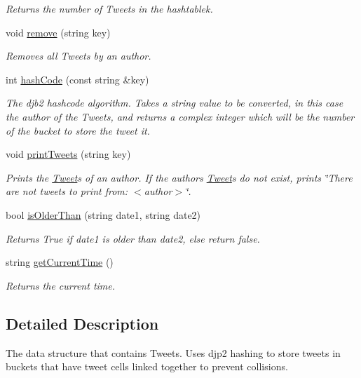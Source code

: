 \begin{DoxyCompactItemize}
\begin{DoxyCompactList}\small\item\em Returns the number of Tweets in the hashtablek. \end{DoxyCompactList}\item 
void \hyperlink{class_hashtable_aeb8fff247cc15d21d19c502294b3e780}{remove} (string key)
\begin{DoxyCompactList}\small\item\em Removes all Tweets by an author. \end{DoxyCompactList}\item 
int \hyperlink{class_hashtable_a94158aebac47b4324179a004084cb522}{hash\+Code} (const string \&key)
\begin{DoxyCompactList}\small\item\em The djb2 hashcode algorithm. Takes a string value to be converted, in this case the author of the Tweets, and returns a complex integer which will be the number of the bucket to store the tweet it. \end{DoxyCompactList}\item 
void \hyperlink{class_hashtable_ad15f012f568360b9b2e2a7903756ebf2}{print\+Tweets} (string key)
\begin{DoxyCompactList}\small\item\em Prints the \hyperlink{class_tweet}{Tweet}\textquotesingle{}s of an author. If the author\textquotesingle{}s \hyperlink{class_tweet}{Tweet}\textquotesingle{}s do not exist, prints \char`\"{}\+There are not tweets to print from\+: $<$author$>$\char`\"{}. \end{DoxyCompactList}\item 
bool \hyperlink{class_hashtable_a230cc395d2cd41dd3a71dcc35aecae75}{is\+Older\+Than} (string date1, string date2)
\begin{DoxyCompactList}\small\item\em Returns True if date1 is older than date2, else return false. \end{DoxyCompactList}\item 
string \hyperlink{class_hashtable_af44d17201ae49e4528153085dcb8766b}{get\+Current\+Time} ()
\begin{DoxyCompactList}\small\item\em Returns the current time. \end{DoxyCompactList}\end{DoxyCompactItemize}


\subsection{Detailed Description}
The data structure that contains Tweets. Uses djp2 hashing to store tweets in buckets that have tweet cells linked together to prevent collisions. 

